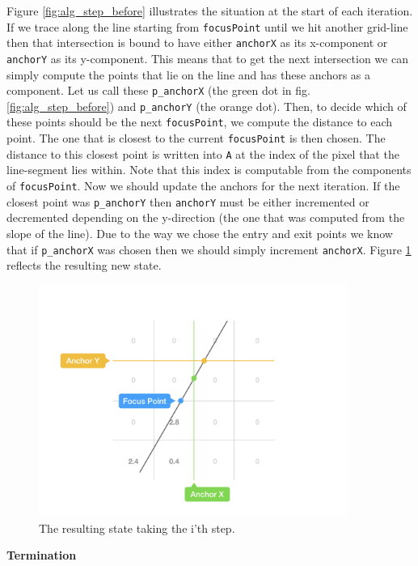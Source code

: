 Figure \ref{fig:alg_step_before}  illustrates the situation at the start of each iteration. If we trace along the line starting from \texttt{focusPoint} until we hit another grid-line then that intersection is bound to have either \texttt{anchorX} as its x-component or \texttt{anchorY} as its y-component. This means that to get the next intersection we can simply compute the points that lie on the line and has these anchors as a component. Let us call these \texttt{p\_anchorX} (the green dot in fig. \ref{fig:alg_step_before}) and \texttt{p\_anchorY} (the orange dot). Then, to decide which of these points should be the next \texttt{focusPoint}, we compute the distance to each point. The one that is closest to the current \texttt{focusPoint} is then chosen. The distance to this closest point is written into \texttt{A} at the index of the pixel that the line-segment lies within. Note that this index is computable from the components of \texttt{focusPoint}. Now we should update the anchors for the next iteration. If the closest point was \texttt{p\_anchorY} then \texttt{anchorY} must be either incremented or decremented depending on the y-direction (the one that was computed from the slope of the line). Due to the way we chose the entry and exit points we know that if \texttt{p\_anchorX} was chosen then we should simply increment \texttt{anchorX}. Figure \ref{fig:alg_step_after} reflects the resulting new state.
\begin{figure}[H]
  \centering
  \includegraphics[width=0.9\textwidth]{figures/alg_step_after.png}
  \caption{The resulting state taking the i'th step.}
  \label{fig:alg_step_after}
\end{figure}
\newpage
\textbf{Termination}\\
